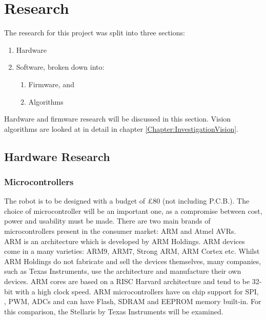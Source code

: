 \chapter{Research} \label{Chapter:Research}
The research for this project was split into three sections:
\begin{enumerate}
\item Hardware
\item Software, broken down into:
\begin{enumerate}
\item Firmware, and
\item Algorithms
\end{enumerate}
\end{enumerate}

Hardware and firmware research will be discussed in this section. Vision algorithms are looked at in detail in chapter \ref{Chapter:InvestigationVision}.
\section{Hardware Research}
\subsection{Microcontrollers}\label{Research:Microcontrollers}
The robot is to be designed with a budget of \pounds 80 (not including P.C.B.). The choice of microcontroller will be an important one, as a compromise between cost, power and usability must be made. There are two main brands of microcontrollers present in the consumer market: ARM and Atmel AVRs.\\ %
ARM is an architecture which is developed by ARM Holdings. ARM devices come in a many varieties: ARM9, ARM7, Strong ARM, ARM Cortex etc. Whilst ARM Holdings do not fabricate and sell the devices themselves, many companies, such as Texas Instruments, use the architecture and manufacture their own devices. ARM cores are based on a RISC Harvard architecture and tend to be 32-bit with a high clock speed. ARM microcontrollers have on chip support for SPI, \itc, PWM, ADCs and can have Flash, SDRAM and EEPROM memory built-in. For this comparison, the Stellaris by Texas Instruments will be examined. 

